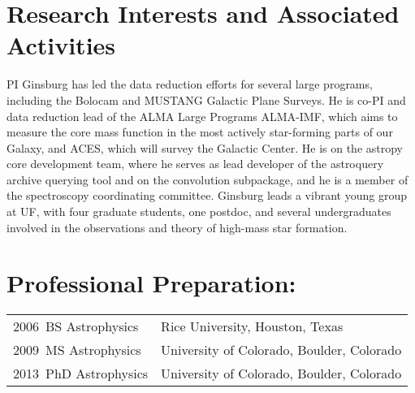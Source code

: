 \documentclass[12pt]{article}
\begin{document}





\section{Research Interests and Associated Activities}
PI Ginsburg has led the data reduction efforts for several large programs, including
the Bolocam and MUSTANG Galactic Plane Surveys.
He is co-PI and data reduction lead of the ALMA Large Programs
ALMA-IMF, which aims to measure the core mass function in the most actively star-forming
parts of our Galaxy, and ACES, which will survey the Galactic Center.
He is on the astropy core development team, where he serves as lead developer of the astroquery
archive querying tool and on the convolution subpackage, and he is a member of the spectroscopy
coordinating committee.
Ginsburg leads a vibrant young group at UF, with four graduate students, one postdoc,
and several undergraduates involved in the observations and theory of high-mass
star formation.

\section{Professional Preparation: }
\begin{tabular} {ll}
    2006~BS Astrophysics & Rice University, Houston, Texas \\
    2009~MS Astrophysics & University of Colorado, Boulder, Colorado \\
    2013~PhD Astrophysics & University of Colorado, Boulder, Colorado \\
\end{tabular}




\setlength{\extrarowheight}{2pt}
\end{document}
